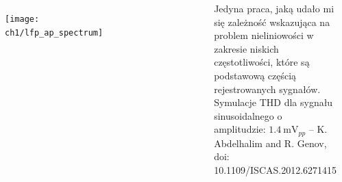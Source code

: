 \begin{frame}[t]
    \begin{columns}
        \begin{figure}[H]
            \centering
            \texttt{[image: ch1/lfp\_ap\_spectrum]}  
            \end{figure}	
        \begin{figure}[H]
            \centering
            \includegraphics[scale=0.17]{Figures/genovTHD.png}
        \end{figure}
        {\renewcommand\normalsize{\scriptsize}%
        \normalsize
            Jedyna praca, jaką udało mi się zależność wskazująca na problem nieliniowości w zakresie niskich częstotliwości, które są podstawową częścią rejestrowanych sygnałów.
            Symulacje THD dla sygnału sinusoidalnego o amplitudzie: $\SI{1.4}{\milli\volt_{pp}}$ -- K. Abdelhalim and R. Genov, doi: 10.1109/ISCAS.2012.6271415}
    \end{columns}

\end{frame}






